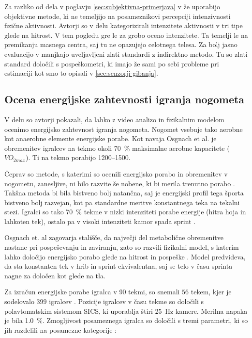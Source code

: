 Za razliko od dela v poglavju \ref{sec:subjektivna-primerjava} v \cite{silva2015assessing} že uporabijo objektivne metode, ki ne temeljijo na posameznikovi percepciji intenzivnosti fizične aktivnosti. Avtorji so v delu kategorizirali intenzitete aktivnosti v tri tipe glede na hitrost. V tem pogledu gre le za grobo oceno intenzitete. Ta temelji le na premikanju masnega centra, saj tu ne opazujejo celotnega telesa. Za bolj jasno evaluacijo v \cite{silva2015assessing} manjkajo uveljavljeni zlati standardi z indirektno metodo. Tu so zlati standard določili s pospeškometri, ki imajo že sami po sebi probleme pri estimaciji kot smo to opisali v \ref{sec:senzorji-gibanja}.




\subsection{Ocena energijske zahtevnosti igranja nogometa}

V delu \cite{osgnach2010energy} so avtorji pokazali, da lahko z video analizo in fizikalnim modelom ocenimo energijsko zahtevnost igranja nogometa. Nogomet vsebuje tako aerobne kot anaerobne elemente energijske porabe. Kot navaja Osgnach et al. \cite{osgnach2010energy} je obremenitev igralcev na tekmo okoli \SI{70}{\%} maksimalne aerobne kapacitete ($VO_{2max}$). Ti na tekmo porabijo \SI{1200}{\kcal}--\SI{1500}{\kcal}. 

Čeprav so metode, s katerimi so ocenili energijsko porabo in obremenitev v nogometu, zanesljive, ni bilo razvite še nobene, ki bi merila trenutno porabo \cite{osgnach2010energy}. Takšna metoda bi bila bistveno bolj natančna, saj je energijski profil tega športa bistveno bolj razvejan, kot pa standardne meritve konstantnega teka na tekalni stezi. Igralci so tako \SI{70}{\%} tekme v nizki intenziteti porabe energije (hitra hoja in lahkoten tek), ostalo pa v visoki intenziteti kamor spada sprint \cite{osgnach2010energy}. 

Osgnach et. al \cite{osgnach2010energy} zagovarja stališče, da največji del metabolične obremenitve nastane pri pospeševanju in zaviranju, zato so razvili fizikalni model, s katerim lahko določijo energijsko porabo glede na hitrost in pospeške \cite{osgnach2010energy}. Model predvideva, da sta konstanten tek v hrib in sprint ekvivalentna, saj se telo v času sprinta nagne za določen kot glede na tla.  

Za izračun energijske porabe igralca v \SI{90}{\min} tekmi, so snemali $56$ tekem, kjer je sodelovalo $399$ igralcev \cite{osgnach2010energy}. Pozicije igralcev v času tekme so določili s polavtomatskim sistemom SICS, ki uporablja štiri \SI{25}{\Hz} kamere. Merilna napaka je bila \SI{1.0}{\%}. Zmogljivost posameznega igralca so določili s tremi parametri, ki so jih razdelili na posamezne kategorije \cite{osgnach2010energy}:

